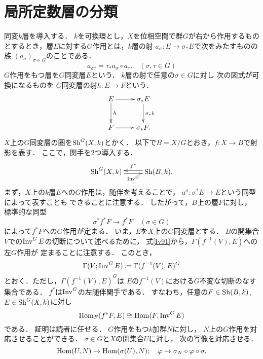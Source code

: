 \clearpage
\section{局所定数層の分類{\cite[IV.9]{Iv}}}

同変\(k\)層を導入する．
\(k\)を可換環とし，\(X\)を位相空間で群\(G\)が右から作用するもの
とするとき，層\(E\)に対する\(G\)作用とは，\(k\)層の射
\(a_\sigma\colon E\to \sigma_{\ast}E\)で次をみたすものの族
\((a_\sigma)_{\sigma\in G}\)のことである．
\begin{equation}
    a_{\sigma\tau}=\tau_{\ast}a_\sigma\circ a_{\tau}. \quad(\sigma,\tau\in G)\label{Iv91}
\end{equation}
\(G\)作用をもつ層を\(G\)同変層\(E\)という．
\(k\)層の射で任意の\(\sigma\in G\)に対し
次の図式が可換になるものを
\(G\)同変層の射\(h\colon E\to F\)という．
\[
    \vcenter{\xymatrix@C=26pt@R=26pt{
        E
        \ar[r]^-{}
        \ar[d]^-{h}
        &
        \sigma_\ast E
        \ar[d]^-{\sigma_\ast h} 
        \\
        F \ar[r]^-{}
        &
        \sigma_\ast F.
    }}
\]
\(X\)上の\(G\)同変層の圏を\(\mathrm{Sh}^G(X,k)\)とかく．
以下で\(B=X/G\)とおき，\(f\colon X\to B\)で射影を表す．
ここで，関手を2つ導入する．
\begin{equation}
    \vcenter{\xymatrix@C=26pt@R=26pt{
        \Sh^G(X,k)
        \ar@<-0.5ex>[r]_-{\Inv^G}
        &
        \Sh(B,k)
        \ar@<-0.5ex>[l]_-{f^\ast}.
    }}\label{Iv92}
\end{equation}
まず，\(X\)上の\(k\)層\(E\)への\(G\)作用は，随伴を考えることで，
\(a^{\sigma}\colon\sigma^\ast E\to E\)という同型によって表すことも
できることに注意する．
したがって，\(B\)上の層\(F\)に対し，
標準的な同型\[
    \sigma^\ast f^\ast F\to f^\ast F\quad (\sigma\in G)
\]によって\(f^\ast F\)への\(G\)作用が定まる．
いま，\(E\)を\(X\)上の\(G\)同変層とする．
\(B\)の開集合\(V\)での\(\mathop{\mathrm{Inv}}\nolimits^G E\)の切断について述べるために，
式\eqref{Iv91}から，\(\Gamma(f^{-1}(V),E)\)への左\(G\)作用が
定まることに注意する．
このとき，
\[
    \Gamma(V;\mathop{\mathrm{Inv}}\nolimits^G E)\coloneqq 
    \Gamma(f^{-1}(V),E)^G
\]
とおく．ただし，\(\Gamma(f^{-1}(V),E)^G\)は
\(E\)の\(f^{-1}(V)\)における\(G\)不変な切断のなす集合である．
\(f^\ast\)は\(\mathop{\mathrm{Inv}}\nolimits^G\)の左随伴関手である．
すなわち，任意の\(F\in\mathrm{Sh}(B,k)\), \(E\in\mathrm{Sh}^G(X,k)\)に対し
\begin{equation}
    \mathop{\mathrm{Hom}}\nolimits_F(f^\ast{F},E)\cong \mathop{\mathrm{Hom}}\nolimits(F,\mathop{\mathrm{Inv}}\nolimits^G{E})
\end{equation}
である．
証明は読者に任せる．
\(G\)作用をもつ\(k\)加群\(N\)に対し，
\(N\)上の\(G\)作用を対応させることができる．
\(\sigma\in G\)と\(X\)の開集合\(U\)に対し，
次の写像を対応させる．
\begin{equation}
    \mathop{\mathrm{Hom}}\nolimits(U,N)\to \mathop{\mathrm{Hom}}\nolimits(\sigma(U),N);
    \quad 
    \varphi\to \sigma_N\circ \varphi\circ\sigma.\label{94}
\end{equation}

